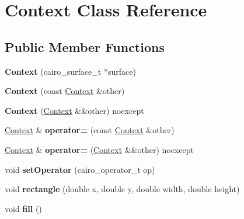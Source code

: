 \hypertarget{classContext}{}\section{Context Class Reference}
\label{classContext}
\subsection*{Public Member Functions}
\begin{DoxyCompactItemize}
\item 
\mbox{\label{classContext_a0e2e39a92924a104f2bfda6d8880c957}} 
{\bfseries Context} (cairo\+\_\+surface\+\_\+t $\ast$surface)
\item 
\mbox{\label{classContext_ae0f8c5a4ff8582a9a5c4e0f0cfb4ac8e}} 
{\bfseries Context} (const \mbox{\hyperlink{classContext}{Context}} \&other)
\item 
\mbox{\label{classContext_af612652ad01d8bb202d22ed9927aca94}} 
{\bfseries Context} (\mbox{\hyperlink{classContext}{Context}} \&\&other) noexcept
\item 
\mbox{\label{classContext_a8c31e4590b0b379f7025a5384e621ca2}} 
\mbox{\hyperlink{classContext}{Context}} \& {\bfseries operator=} (const \mbox{\hyperlink{classContext}{Context}} \&other)
\item 
\mbox{\label{classContext_a42a9ddda1c8554234b02877c03e170d3}} 
\mbox{\hyperlink{classContext}{Context}} \& {\bfseries operator=} (\mbox{\hyperlink{classContext}{Context}} \&\&other) noexcept
\item 
\mbox{\label{classContext_a8fefd74350dc9276b237b43de89c4f36}} 
void {\bfseries set\+Operator} (cairo\+\_\+operator\+\_\+t op)
\item 
\mbox{\label{classContext_aa90a90f807ca1fa9b58b58c9bbcfdb29}} 
void {\bfseries rectangle} (double x, double y, double width, double height)
\item 
\mbox{\label{classContext_a5e85b7f5891be1cdbaabc975ad32a9d5}} 
void {\bfseries fill} ()
\item 
\mbox{\label{classContext_a2b0781e7cc1cfe165ea17c6750ae1e68}} 

\end{DoxyCompactItemize}
